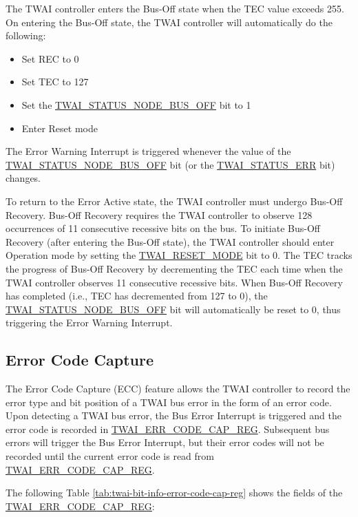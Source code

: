 \documentclass[main\_\_EN.tex]{subfiles}
\begin{document}
The TWAI controller enters the Bus-Off state when the TEC value exceeds 255. On entering the Bus-Off state, the TWAI controller will automatically do the following:

\begin{itemize}
    \item Set REC to 0
    \item Set TEC to 127
    \item Set the \hyperref[fielddesc:TWAISTATUSNODEBUSOFF]{TWAI\_STATUS\_NODE\_BUS\_OFF} bit to 1
    \item Enter Reset mode
\end{itemize}

The Error Warning Interrupt is triggered whenever the value of the \hyperref[fielddesc:TWAISTATUSNODEBUSOFF]{TWAI\_STATUS\_NODE\_BUS\_OFF} bit (or the \hyperref[fielddesc:TWAISTATUSERR]{TWAI\_STATUS\_ERR} bit) changes.

To return to the Error Active state, the TWAI controller must undergo Bus-Off Recovery. Bus-Off Recovery requires the TWAI controller to observe 128 occurrences of 11 consecutive recessive bits on the bus. To initiate Bus-Off Recovery (after entering the Bus-Off state), the TWAI controller should enter Operation mode by setting the \hyperref[fielddesc:TWAIRESETMODE]{TWAI\_RESET\_MODE} bit to 0.
The TEC tracks the progress of Bus-Off Recovery by decrementing the TEC each time when the TWAI controller observes 11 consecutive recessive bits. When Bus-Off Recovery has completed (i.e., TEC has decremented from 127 to 0), the \hyperref[fielddesc:TWAISTATUSNODEBUSOFF]{TWAI\_STATUS\_NODE\_BUS\_OFF} bit will automatically be reset to 0, thus triggering the Error Warning Interrupt.


\subsection{Error Code Capture}

The Error Code Capture (ECC) feature allows the TWAI controller to record the error type and bit position of a TWAI bus error in the form of an error code. Upon detecting a TWAI bus error, the Bus Error Interrupt is triggered and the error code is recorded in \hyperref[regdesc:TWAIERRCODECAPREG]{TWAI\_ERR\_CODE\_CAP\_REG}. Subsequent bus errors will trigger the Bus Error Interrupt, but their error codes will not be recorded until the current error code is read from \hyperref[regdesc:TWAIERRCODECAPREG]{TWAI\_ERR\_CODE\_CAP\_REG}.

The following Table \ref{tab:twai-bit-info-error-code-cap-reg} shows the fields of the \hyperref[regdesc:TWAIERRCODECAPREG]{TWAI\_ERR\_CODE\_CAP\_REG}:
\end{document}
